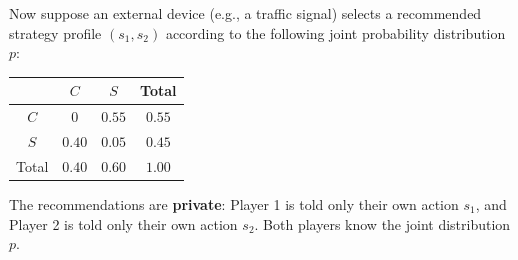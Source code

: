 \documentclass[12pt, a4paper]{article}
\begin{document}
Now suppose an external device (e.g., a traffic signal) selects a recommended strategy profile $(s_1, s_2)$ according to the following joint probability distribution $p$:

\begin{center}
\renewcommand{\arraystretch}{1.2}
\begin{tabular}{c|cc|c}
 & $C$ & $S$ & Total \\ \hline
$C$ & $0$ & $0.55$ & $0.55$ \\
$S$ & $0.40$ & $0.05$ & $0.45$ \\ \hline
Total & $0.40$ & $0.60$ & $1.00$
\end{tabular}
\end{center}

The recommendations are \textbf{private}: Player 1 is told only their own action $s_1$, and Player 2 is told only their own action $s_2$. Both players know the joint distribution $p$.
\end{document}
